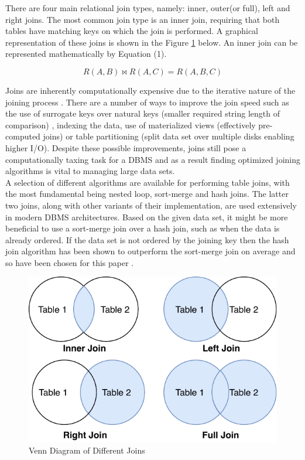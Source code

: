 \documentclass[10.5 pt, conference]{IEEEtran}
\begin{document}
There are four main relational join types, namely: inner, outer(or full), left and right joins. The most common join type is an inner join, requiring that both tables have matching keys on which the join is performed. A graphical representation of these joins is shown in the Figure \ref{JoinTypes} below. An inner join can be represented mathematically by Equation (1).

\begin{equation}
R(A,B) \bowtie R(A,C) = R(A,B,C)
\end{equation}

Joins are inherently computationally expensive due to the iterative nature of the joining process \cite{Stephens2004}. There are a number of ways to improve the join speed such as the use of surrogate keys over natural keys (smaller required string length of comparison) , indexing the data, use of materialized views (effectively pre-computed joins) or table partitioning (split data set over multiple disks enabling higher I/O)\cite{Stephens2004}. Despite these possible improvements, joins still pose a computationally taxing task for a DBMS and as a result finding optimized joining algorithms is vital to managing large data sets.\\

A selection of different algorithms are available for performing table joins, with the most fundamental being nested loop, sort-merge and hash joins\cite{Chu}. The latter two joins, along with other variants of their implementation, are used extensively in modern DBMS architectures. Based on the given data set, it might be more beneficial to use a sort-merge join over a hash join, such as when the data is already ordered. If the data set is not ordered by the joining key then the hash join algorithm has been shown to outperform the sort-merge join on average and so have been chosen for this paper \cite{Albutiu}.

\begin{figure}[h!]
\centering
\includegraphics[width=\columnwidth]{JoinTypes.pdf}
\centering
\caption{Venn Diagram of Different Joins}
\label{JoinTypes}
\end{figure}
\end{document}
